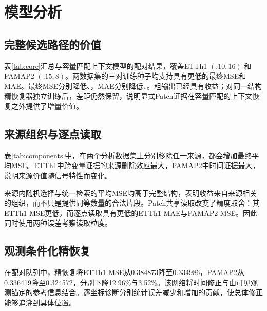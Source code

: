 \section{模型分析}\label{sec:analysis}
\subsection{完整候选路径的价值}
表\ref{tab:core}汇总\Model{}与容量匹配上下文模型的配对结果，覆盖ETTh1 $(.10,16)$ 和PAMAP2 $(.15,8)$。两数据集的三对训练种子均支持\Model{}具有更低的最终MSE和MAE。最终MSE分别降低\GainETTMSE{}、\GainPAMMSE{}，MAE分别降低\GainETTMAE{}、\GainPAMMAE{}。粗输出已经具有收益；对同一结构精恢复器独立训练后，差距仍然保留，说明显式Patch证据在容量匹配的上下文恢复之外提供了增量价值。

\begin{table}[t]
 \centering\small\setlength{\tabcolsep}{4pt}
 
 \caption{候选路径配对分析。两个数据集均为三个训练种子，每模型平均二十组共享测试遮挡。PAMAP2机制分析队列与表\ref{tab:formal}的正式结果队列分开；粗精结果来自同一选定模型对。}
 \label{tab:core}
\end{table}

\subsection{来源组织与逐点读取}
表\ref{tab:components}中，在两个分析数据集上分别移除任一来源，都会增加最终平均MSE。ETTh1中跨变量证据的来源删除效应最大，PAMAP2中时间证据最大，说明来源价值随信号特性而变化。

来源内随机选择与统一检索的平均MSE均高于完整结构，表明收益来自来源相关的组织，而不只是提供同等数量的合法片段。Patch共享读取改变了精度取舍：其ETTh1 MSE更低，而逐点读取具有更低的ETTh1 MAE与PAMAP2 MSE。因此同时使用两种误差考察读取粒度。

\begin{table}[t]
 \centering\small\setlength{\tabcolsep}{3pt}
 
 \caption{精恢复后的组件与检索对照。ETTh1为三个训练种子均值$\pm$样本标准差，PAMAP2组件行统一使用seed2023；每个模型均评价二十组共享遮挡。PAMAP2的三种子\Model{}与容量匹配上下文模型对照单列于表\ref{tab:core}。}
 \label{tab:components}
\end{table}

\subsection{观测条件化精恢复}
在\Model{}配对队列中，精恢复将ETTh1 MSE从0.384873降至0.334986，PAMAP2从0.336419降至0.324572，分别下降12.96\%与3.52\%。该网络将时间修正与由可见观测锚定的参考信息结合。逐坐标诊断分别统计误差减少和增加的贡献，使总体修正能够追溯到具体位置。

